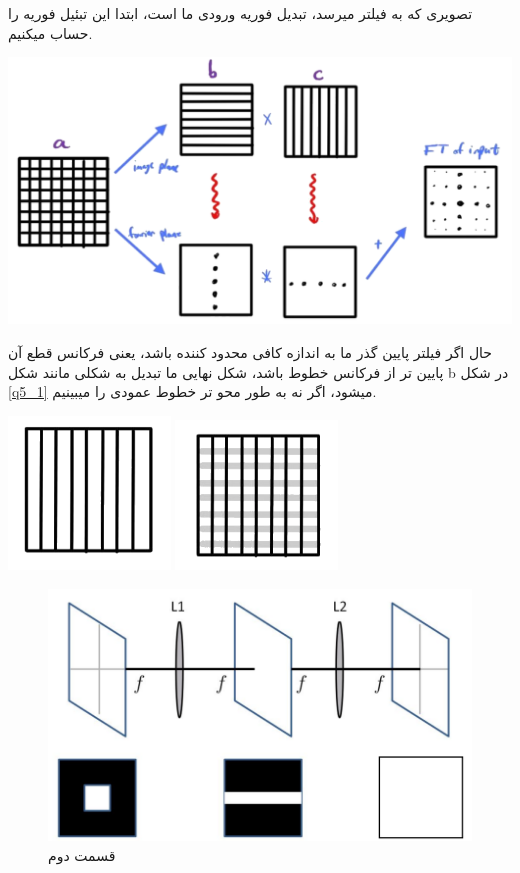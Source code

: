 \begin{qsolve}[]
    تصویری که به فیلتر میرسد، تبدیل فوریه ورودی ما است، ابتدا این تبئیل فوریه را حساب میکنیم.
    \begin{center}
        \includegraphics*[width=0.8\linewidth]{pics/q5_1_ans.png}
        \label{q5_1}
    \end{center}

    حال اگر فیلتر پایین گذر ما به اندازه کافی محدود کننده باشد، یعنی فرکانس قطع آن پایین تر از فرکانس خطوط باشد، 
    شکل نهایی ما تبدیل به شکلی مانند شکل b در شکل \ref*{q5_1} میشود، اگر نه به طور محو تر خطوط عمودی را میبینیم.

    \begin{center}
        \includegraphics*[width=4.3cm,angle=90]{pics/q1_1_ans_2_1.png}
        \includegraphics*[width=4.3cm,angle=90]{pics/q1_1_ans_2_2.png}
    \end{center}
\end{qsolve}

\begin{figure}[h]
    \caption{قسمت دوم}
    \centering
    \includegraphics*[width=0.5\linewidth]{pics/q5_2.png}
\end{figure}

